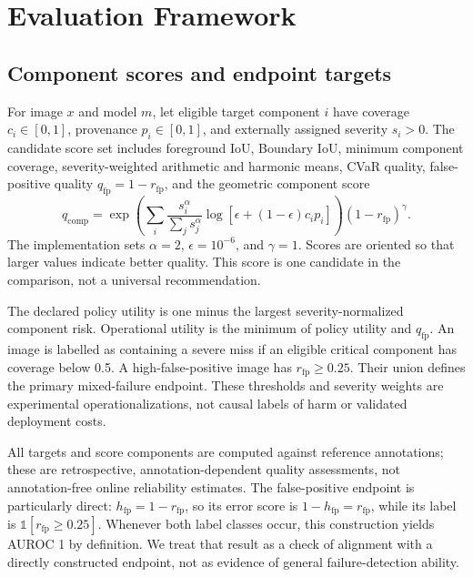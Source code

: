 \section{Evaluation Framework}

\subsection{Component scores and endpoint targets}
For image $x$ and model $m$, let eligible target component $i$ have coverage
$c_i\in[0,1]$, provenance $p_i\in[0,1]$, and externally assigned severity
$s_i>0$. The candidate score
set includes foreground IoU, Boundary IoU, minimum component coverage,
severity-weighted arithmetic and harmonic means, CVaR quality, false-positive
quality $q_{\mathrm{fp}}=1-r_{\mathrm{fp}}$, and the geometric component
score
\begin{equation}
 q_{\mathrm{comp}} =
 \exp\!\left(\sum_i \frac{s_i^\alpha}{\sum_j s_j^\alpha}
 \log[\epsilon+(1-\epsilon)c_i p_i]\right)
 (1-r_{\mathrm{fp}})^\gamma .
 \label{eq:component-score}
\end{equation}
The implementation sets $\alpha=2$, $\epsilon=10^{-6}$, and $\gamma=1$.
Scores are oriented so that larger values indicate better quality. This score
is one candidate in the comparison, not a universal recommendation.

The declared policy utility is one minus the largest severity-normalized
component risk. Operational utility is the minimum of policy utility and
$q_{\mathrm{fp}}$. An image is labelled as containing a severe miss if an
eligible critical component has coverage below 0.5. A high-false-positive
image has $r_{\mathrm{fp}}\geq0.25$. Their union defines the primary
mixed-failure endpoint. These thresholds and severity weights are experimental
operationalizations, not causal labels of harm or validated deployment costs.

All targets and score components are computed against reference annotations;
these are retrospective, annotation-dependent quality assessments, not
annotation-free online reliability estimates. The false-positive endpoint is
particularly direct: $h_{\mathrm{fp}}=1-r_{\mathrm{fp}}$, so its error score
is $1-h_{\mathrm{fp}}=r_{\mathrm{fp}}$, while its label is
$\mathbb{1}[r_{\mathrm{fp}}\geq0.25]$. Whenever both label classes occur,
this construction yields AUROC 1 by definition. We treat that result as a
check of alignment with a directly constructed endpoint, not as evidence of
general failure-detection ability.

